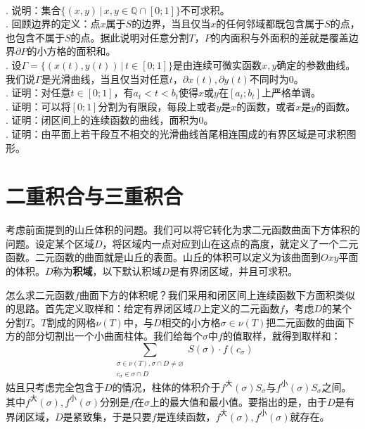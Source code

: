 \documentclass[12pt,UTF8,fontset=none]{ctexbook}
\begin{document}
\begin{xt}
    \mbox{} \\
    . 说明：集合$\{(x,y)\,|\,x,y\in\mathbb{Q}\cap[0;1]\}$不可求积。\\
    . 回顾边界的定义：点$x$属于$S$的边界，当且仅当$x$的任何邻域都既包含属于$S$的点，也包含不属于$S$的点。据此说明对任意分割$T$，$P$的内面积与外面积的差就是覆盖边界$\partial P$的小方格的面积和。\\
    . 设$\Gamma = \{(x(t),y(t))\,|\,t\in[0;1]\}$是由连续可微实函数$x,y$确定的参数曲线。我们说$\Gamma$是光滑曲线，当且仅当对任意$t$，$\partial x(t), \partial y(t)$不同时为$0$。\\
    . 证明：对任意$t\in[0;1]$，有$a_t<t<b_t$使得$x$或$y$在$[a_t;b_t]$上严格单调。\\
    . 证明：可以将$[0;1]$分割为有限段，每段上或者$y$是$x$的函数，或者$x$是$y$的函数。\\
    . 证明：闭区间上的连续函数的曲线，面积为$0$。\\
    . 证明：由平面上若干段互不相交的光滑曲线首尾相连围成的有界区域是可求积图形。
\end{xt}

\section{二重积合与三重积合}
考虑前面提到的山丘体积的问题。我们可以将它转化为求二元函数曲面下方体积的问题。设定某个区域$D$，将区域内一点对应到山在这点的高度，就定义了一个二元函数。二元函数的曲面就是山丘的表面。山丘的体积可以定义为该曲面到$Oxy$平面的体积。$D$称为\textbf{积域}，以下默认积域$D$是有界闭区域，并且可求积。

怎么求二元函数$f$曲面下方的体积呢？我们采用和闭区间上连续函数下方面积类似的思路。首先定义取样和：给定有界闭区域$D$上定义的二元函数$f$，考虑$D$的某个分割$T$。$T$割成的网格$\nu(T)$中，与$D$相交的小方格$\sigma\in\nu(T)$把二元函数的曲面下方的部分切割出一个小曲面柱体。我们给每个$\sigma$中$f$的值取样，就得到取样和：
$$ \sum_{\substack{\sigma\in \nu(T),\sigma\cap D\neq\varnothing\\c_{\sigma}\in\sigma\cap D}} S(\sigma)\cdot f(c_{\sigma}) $$
姑且只考虑完全包含于$D$的情况，柱体的体积介于$f^{\text{大}}(\sigma)S_{\sigma}$与$f^{\text{小}}(\sigma)S_{\sigma}$之间。其中$f^{\text{大}}(\sigma),f^{\text{小}}(\sigma)$分别是$f$在$\sigma$上的最大值和最小值。要指出的是，由于$D$是有界闭区域，$D$是紧致集，于是只要$f$是连续函数，$f^{\text{大}}(\sigma),f^{\text{小}}(\sigma)$就存在。
\end{document}
